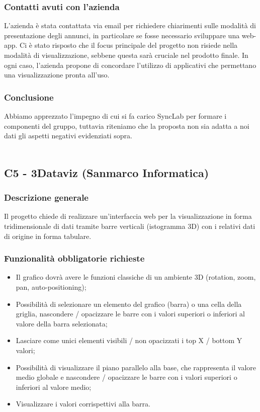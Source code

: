 \documentclass[10pt]{article}
\begin{document}
\subsubsection{Contatti avuti con l'azienda}
L'azienda è stata contattata via email per richiedere chiarimenti sulle modalità di presentazione degli annunci, in particolare se fosse necessario sviluppare una web-app. Ci è stato risposto che il focus principale del progetto non risiede nella modalità di visualizzazione, sebbene questa sarà cruciale nel prodotto finale. In ogni caso, l'azienda propone di concordare l'utilizzo di applicativi che permettano una visualizzazione pronta all'uso.
\subsubsection{Conclusione}
Abbiamo apprezzato l’impegno di cui si fa carico SyncLab per formare i componenti del gruppo, tuttavia riteniamo che la proposta non sia adatta a noi dati gli aspetti negativi evidenziati sopra.
\\\\
\subsection{C5 - 3Dataviz (Sanmarco Informatica)}
\subsubsection{Descrizione generale}
Il progetto chiede di realizzare un'interfaccia web per la visualizzazione in forma
tridimensionale di dati tramite barre verticali (istogramma 3D) con i relativi dati di origine in forma tabulare.
\subsubsection{Funzionalità obbligatorie richieste}
\begin{itemize}
    \item Il grafico dovrà avere le funzioni classiche di un ambiente 3D (rotation, zoom, pan, auto-positioning);
    \item Possibilità di selezionare un elemento del grafico (barra) o una cella della griglia, nascondere / opacizzare le barre con i valori superiori o inferiori al valore della barra selezionata;
    \item Lasciare come unici elementi visibili / non opacizzati i top X / bottom Y valori;
    \item Possibilità di visualizzare il piano parallelo alla base, che rappresenta il valore medio globale e nascondere / opacizzare le barre con i valori superiori o inferiori al valore medio;
    \item Visualizzare i valori corrispettivi alla barra.
\end{itemize}
\end{document}
